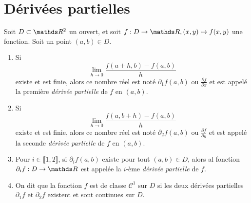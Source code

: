 \section{Dérivées partielles}

\begin{defn}
	Soit $D \subset \R^2$ un ouvert, et soit $f : D \to \R, (x,y) \mapsto f(x,y)$ une fonction.
	Soit un point $(a,b) \in D$.
	\begin{enumerate}
		\item Si \[
				\lim_{h\to 0} \frac{f(a+h,b) - f(a,b)}{h}
			\] existe et est finie, alors ce nombre réel est noté $\partial_1 f(a,b)$ ou $\frac{\partial f}{\partial x}$ et est appelé la première \textit{dérivée partielle} de $f$ en $(a,b)$.
		\item Si \[
				\lim_{h\to 0} \frac{f(a,b+h) - f(a,b)}{h}
			\] existe et est finie, alors ce nombre réel est noté $\partial_2 f(a,b)$ ou $\frac{\partial f}{\partial y}$ et est appelé la seconde \textit{dérivée partielle} de $f$ en $(a,b)$.
		\item Pour $i \in \llbracket 1,2 \rrbracket$, si $\partial_i f(a,b)$ existe pour tout $(a,b) \in D$, alors al fonction $\partial_i f : D \to \R$ est appelée la $i$-ème \textit{dérivée partielle} de $f$.
		\item On dit que la fonction $f$ est de classe $\mathcal{C}^1$ sur $D$ si les deux dérivées partielles $\partial_1 f$ et $\partial_2 f$ existent et sont continues sur $D$.
	\end{enumerate}
\end{defn}

